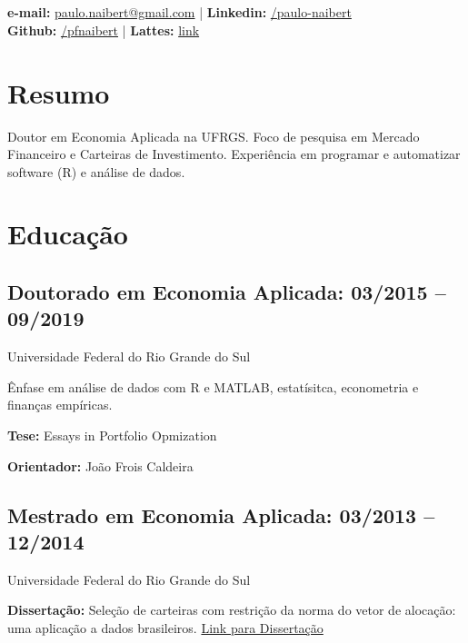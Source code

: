 \documentclass[10pt,a4paper]{article}
\author{Paulo Ferreira Naibert}
\makeatletter
\newcommand{\ufrgs}{{Universidade Federal do Rio Grande do Sul}}
\renewcommand{\maketitle}{
\begin{center}
{\huge\bfseries\theauthor}
\\
\\
\vspace{.25em}
\textbf{e-mail:} \href{mailto:paulo.naibert@gmail.com}{paulo.naibert@gmail.com} |
\textbf{Linkedin:} \href{https://www.linkedin.com/in/paulo-naibert}{/paulo-naibert}
\\
\textbf{Github:} \href{https://github.com/pfnaibert}{/pfnaibert} |
\textbf{Lattes:} \href{http://lattes.cnpq.br/1511789633871437}{link}
\end{center}
}
\makeatother
\begin{document}

\maketitle

\vspace{-1.5 em}
\section{Resumo}
\noindent
Doutor em Economia Aplicada na UFRGS.
Foco de pesquisa em Mercado Financeiro e Carteiras de Investimento.
Experiência em programar e automatizar software (R) e análise de dados.


\vspace{-1.5 em}
\section{Educação}

\subsection{Doutorado em Economia Aplicada: 03/2015 -- 09/2019}
\ufrgs{}

Ênfase em análise de dados com R e MATLAB, estatísitca, econometria e finanças empíricas.

\textbf{Tese:} Essays in Portfolio Opmization

\textbf{Orientador:} João Frois Caldeira

\vspace{-1 em}
\subsection{Mestrado em Economia Aplicada: 03/2013 -- 12/2014}
\ufrgs{}

\textbf{Dissertação:}
Seleção de carteiras com restrição da norma do vetor de alocação: uma aplicação a dados brasileiros.
\href{http://www.lume.ufrgs.br/handle/10183/132904}{Link para Dissertação}
\end{document}
